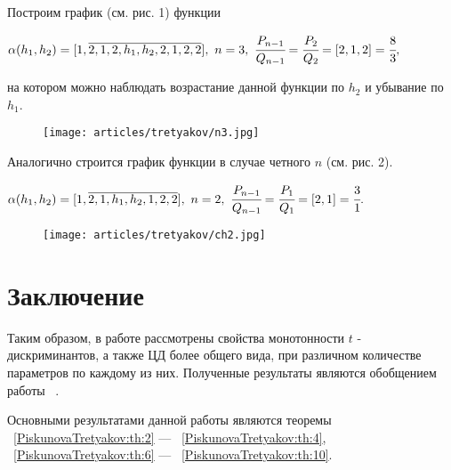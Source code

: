 \begin{exampler} Построим график (см. рис. 1) функции
\begin{center}
$\alpha(h_1,h_2)=[1,\overline{2,1,2,{h_1},{h_2},2,1,2,2}],\ n=3,\ \cfrac {P_{n-1}}{Q_{n-1}}=\cfrac {P_2}{Q_2}=[2,1,2]=\cfrac 83,$
\end{center}
на котором можно наблюдать возрастание данной функции по $h_2$ и убывание по $h_1$.

\begin{figure*}[h!]
\texttt{[image: articles/tretyakov/n3.jpg]}
\caption{}
\end{figure*}
\end{exampler}

\newpage
\begin{exampler} Аналогично строится график функции в случае четного $n$ (см. рис. 2).
\begin{center}
$\alpha(h_1,h_2)=[1,\overline{2,1,{h_1},{h_2},1,2,2}],\ n=2,\ \cfrac {P_{n-1}}{Q_{n-1}}=\cfrac {P_1}{Q_1}=[2,1]=\cfrac 31.$
\end{center}

\begin{figure*}[h!]
\texttt{[image: articles/tretyakov/ch2.jpg]}
\caption{}
\end{figure*}
\end{exampler}


\section*{Заключение}

Таким образом, в работе рассмотрены свойства монотонности ${t}$ - дискриминантов, а также ЦД более общего вида, при различном количестве параметров по каждому из них. Полученные результаты являются обобщением работы ~\cite{PiskunovaTretyakov:2017:5}.

Основными результатами данной работы являются теоремы ~\ref{PiskunovaTretyakov:th:2} --- ~\ref{PiskunovaTretyakov:th:4}, ~\ref{PiskunovaTretyakov:th:6} --- ~\ref{PiskunovaTretyakov:th:10}.


